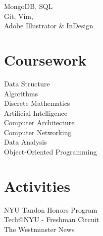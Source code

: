 \documentclass[]{hieudo-build}
\begin{document}
\begin{minipage}[t]{0.34\textwidth}
MongoDB, SQL \\

Git, Vim, \\
Adobe Illustrator \& InDesign \\ 

\sectionsep



\section{Coursework}
Data Structure \\
Algorithms \\
Discrete Mathematics \\
Artificial Intelligence \\
Computer Architecture \\
Computer Networking \\
Data Analysis \\
Object-Oriented Programming\\
\sectionsep

\section{Activities}
NYU Tandon Honors Program\\
Tech@NYU - Freshman Circuit \\
The Westminster News \\
\sectionsep



\end{minipage}
\end{document}
